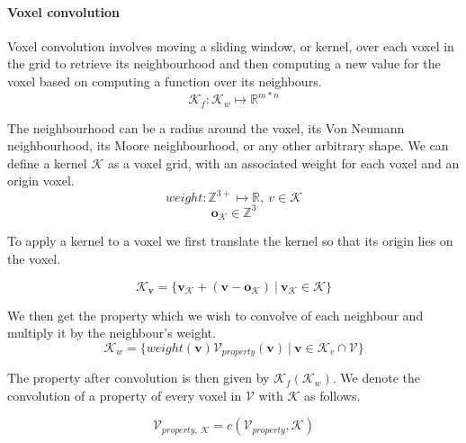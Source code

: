 \paragraph{Voxel convolution}
Voxel convolution involves moving a sliding window, or kernel, over each voxel in the grid to retrieve its neighbourhood and then computing a new value for the voxel based on computing a function  over its neighbours.
\begin{equation}
    \label{eq:convolution}
    \mathcal{K}_f: \mathcal{K}_w \mapsto \mathbb{R}^{m*n}
\end{equation}

The neighbourhood can be a radius around the voxel, its Von Neumann neighbourhood, its Moore neighbourhood, or any other arbitrary shape. We can define a kernel \(\mathcal{K}\) as a voxel grid, with an associated weight for each voxel  and an origin voxel.
\begin{equation}
weight: \mathbb{Z}^{3+} \mapsto \mathbb{R},\ v \in {\mathcal{K}}
\end{equation}
\begin{equation}
\boldsymbol{o}_{\mathcal{K}} \in \mathbb{Z}^{3}
\end{equation}

To apply a kernel to a voxel we first translate the kernel so that its origin lies on the voxel.

\begin{equation}
    \label{eq:kv}
\mathcal{K}_{\boldsymbol{v}} = \{\boldsymbol{v_{\mathcal{K}}} + (\boldsymbol{v} - \boldsymbol{o_{\mathcal{K}}})\ |\ \boldsymbol{v_{\mathcal{K}}} \in \mathcal{K}\}
\end{equation}

We then get the property which we wish to convolve of each neighbour and multiply it by the neighbour's weight.
\begin{equation}
    \label{eq:kw}
    \mathcal{K}_{w} = \{weight(\boldsymbol{v})\mathcal{V}_{property}(\boldsymbol{v})\ |\ \boldsymbol{v} \in \mathcal{K}_{v} \cap \mathcal{V}\}
\end{equation}

The property after convolution is then given by \(\mathcal{K}_f(\mathcal{K}_{w})\). We denote the convolution of a property of every voxel in \(\mathcal{V}\) with \(\mathcal{K}\) as follows.

\begin{equation}
    \label{eq:c}
    \mathcal{V}_{property,\  \mathcal{K}} = c(\mathcal{V}_{property},\mathcal{K})
\end{equation}

